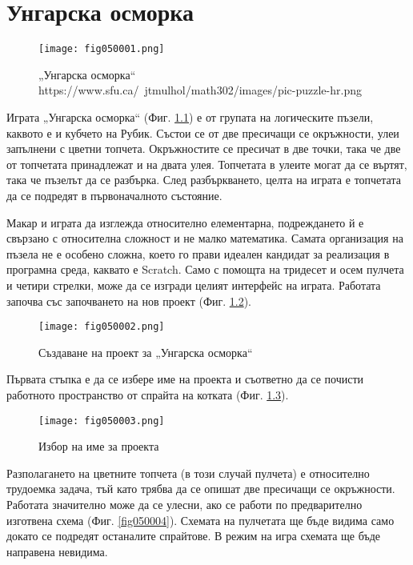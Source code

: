 ﻿\chapter{Унгарска осморка}

\begin{figure}[H]
  \centering
  \texttt{[image: fig050001.png]}
  \caption{„Унгарска осморка“ \\ https://www.sfu.ca/~jtmulhol/math302/images/pic-puzzle-hr.png}
\label{fig050001}
\end{figure}

Играта „Унгарска осморка“ (Фиг. \ref{fig050001}) е от групата на логическите пъзели, каквото е и кубчето на Рубик. Състои се от две пресичащи се окръжности, улеи запълнени с цветни топчета. Окръжностите се пресичат в две точки, така че две от топчетата принадлежат и на двата улея. Топчетата в улеите могат да се въртят, така че пъзелът да се разбърка. След разбъркването, целта на играта е топчетата да се подредят в първоначалното състояние. 

Макар и играта да изглежда относително елементарна, подреждането й е свързано с относителна сложност и не малко математика. Самата организация на пъзела не е особено сложна, което го прави идеален кандидат за реализация в програмна среда, каквато е Scratch. Само с помощта на тридесет и осем пулчета и четири стрелки, може да се изгради целият интерфейс на играта. Работата започва със започването на нов проект (Фиг. \ref{fig050002}).

\begin{figure}[H]
  \centering
  \texttt{[image: fig050002.png]}
  \caption{Създаване на проект за „Унгарска осморка“}
\label{fig050002}
\end{figure}

Първата стъпка е да се избере име на проекта и съответно да се почисти работното пространство от спрайта на котката (Фиг. \ref{fig050003}). 

\begin{figure}[H]
  \centering
  \texttt{[image: fig050003.png]}
  \caption{Избор на име за проекта}
\label{fig050003}
\end{figure}

Разполагането на цветните топчета (в този случай пулчета) е относително трудоемка задача, тъй като трябва да се опишат две пресичащи се окръжности. Работата значително може да се улесни, ако се работи по предварително изготвена схема (Фиг. \ref{fig050004}). Схемата на пулчетата ще бъде видима само докато се подредят останалите спрайтове. В режим на игра схемата ще бъде направена невидима.

